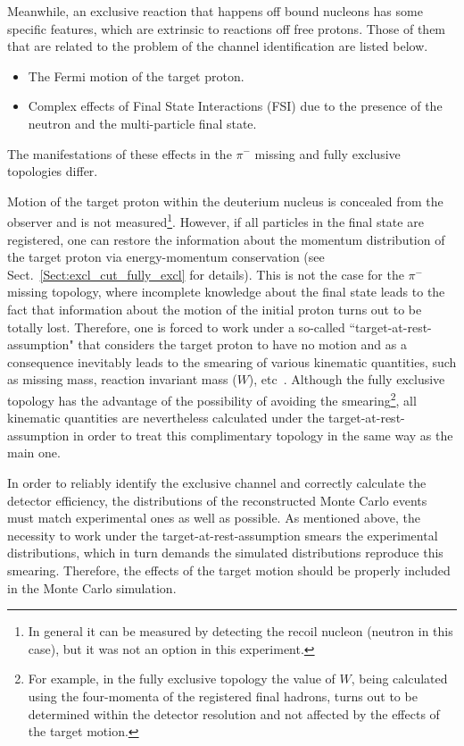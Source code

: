 Meanwhile, an exclusive reaction that happens off bound nucleons has some specific features, which are extrinsic to reactions off free protons. Those of them that are related to the problem of the channel identification are listed below.%

\begin{itemize}
\item  The Fermi motion of the target proton.%
\item Complex effects of Final State Interactions (FSI) due to the presence of the neutron and the multi-particle final state.
\end{itemize}%

The manifestations of these effects in the $\pi^{-}$ missing and fully exclusive topologies differ.

Motion of the target proton within the deuterium nucleus is concealed from the observer and is not measured\footnote[9]{In general it can be measured by detecting the recoil nucleon (neutron in this case), but it was not an option in this experiment.}. However, if all particles in the final state are registered, one can restore the information about the momentum distribution of the target proton via energy-momentum conservation (see Sect.~\ref{Sect:excl_cut_fully_excl} for details). This is not the case for the $\pi^{-}$ missing topology, where incomplete knowledge about the final state leads to the fact that information about the motion of the initial proton turns out to be totally lost. Therefore, one is forced to work under a so-called ``target-at-rest-assumption" that considers the target proton to have no motion and as a consequence inevitably leads to the smearing of various kinematic quantities, such as missing mass, reaction invariant mass ($W$), etc~\cite{Skorodumina:2015rea}. 
Although the fully exclusive topology has the advantage of the possibility of avoiding the smearing\footnote[10]{For example, in the fully exclusive topology the value of $W$, being calculated using the four-momenta of the registered final hadrons, turns out to be determined within the detector resolution and not affected by the effects of the target motion.}, all kinematic quantities are nevertheless calculated under the target-at-rest-assumption in order to treat this complimentary topology in the same way as the main one.


In order to reliably identify the exclusive channel and correctly calculate the detector efficiency, the distributions of the reconstructed Monte Carlo events must match experimental ones as well as possible. As mentioned above, the necessity to work under the target-at-rest-assumption smears the experimental distributions, which in turn demands the simulated distributions reproduce this smearing. Therefore, the effects of the target motion should be properly included in the Monte Carlo simulation.

